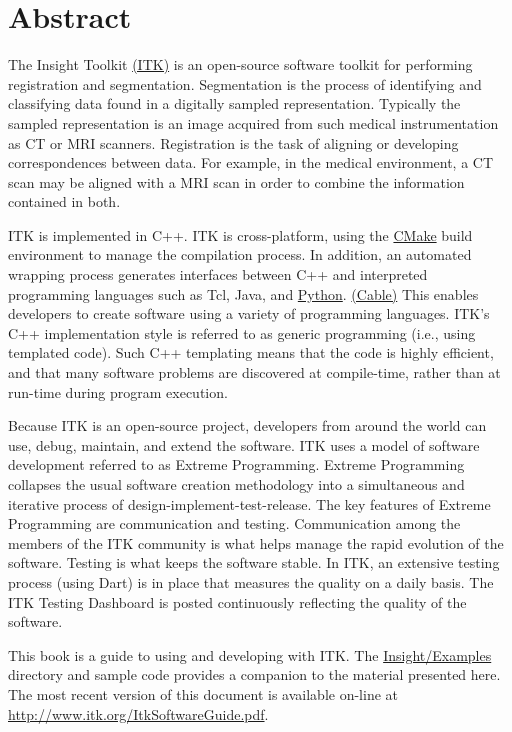\chapter*{Abstract}
\noindent
The Insight Toolkit \href{http://www.itk.org}{(ITK)} is an open-source software
toolkit for performing registration and segmentation. Segmentation is the
process of identifying and classifying data found in a digitally sampled
representation. Typically the sampled representation is an image acquired from
such medical instrumentation as CT or MRI scanners. Registration is the task of
aligning or developing correspondences between data. For example, in the
medical environment, a CT scan may be aligned with a MRI scan in order to
combine the information contained in both.

ITK is implemented in C++. ITK is cross-platform, using the 
\href{http://www.cmake.org}{CMake} 
build environment to manage the compilation process. In addition, an automated
wrapping process generates interfaces between C++ and interpreted programming
languages such as Tcl, Java, and \href{http://www.python.org}{Python}.
\href{http://public.kitware.com/Cable/HTML/Index.html}{(Cable)} This enables
developers to create software using a variety of programming languages. ITK's
C++ implementation style is referred to as generic programming (i.e., using
templated code). Such C++ templating means that the code is highly efficient, 
and that many software problems are discovered at compile-time, rather than at 
run-time during program execution.

Because ITK is an open-source project, developers from around the world can
use, debug, maintain, and extend the software. ITK uses a model of software
development referred to as Extreme Programming. Extreme Programming collapses
the usual software creation methodology into a simultaneous and iterative
process of design-implement-test-release. The key features of Extreme
Programming are communication and testing. Communication among the members of
the ITK community is what helps manage the rapid evolution of the software.
Testing is what keeps the software stable. In ITK, an extensive testing process
(using Dart) is in place that measures the quality on a daily basis. The ITK
Testing Dashboard is posted continuously reflecting the quality of the
software.

This book is a guide to using and developing with ITK. The
\href{http://www.itk.org/cgi-bin/cvsweb.cgi/Insight/Examples/?cvsroot=Insight}{Insight/Examples}
directory and sample code provides a companion to the material presented here.
The most recent version of this document is available on-line at
\url{http://www.itk.org/ItkSoftwareGuide.pdf}.



